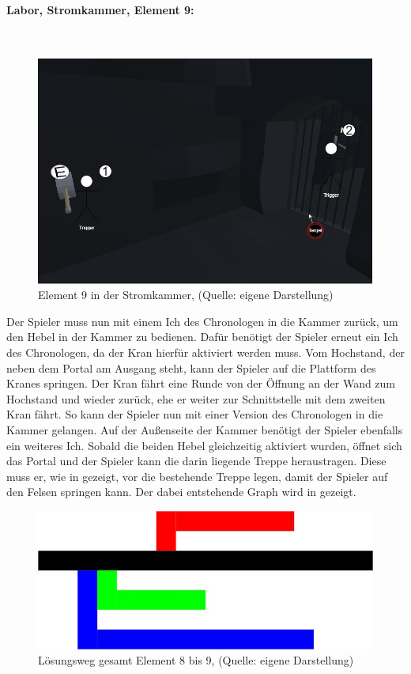 \paragraph{Labor, Stromkammer, Element 9:}\label{p:lse9}
~
\begin{figure}[ht]
\centering
\includegraphics[width=0.8\linewidth]{content/pictures/Raetsel-L02_R01_R10.jpg}
\caption{Element 9 in der Stromkammer, (Quelle: eigene Darstellung)}
\label{fig:L02_R01_R10}
\end{figure}

Der Spieler muss nun mit einem Ich des Chronologen in die Kammer zurück, um den Hebel in der Kammer zu bedienen. Dafür benötigt der Spieler erneut ein Ich des Chronologen, da der Kran hierfür aktiviert werden muss. Vom Hochstand, der neben dem Portal am Ausgang steht, kann der Spieler auf die Plattform des Kranes springen. Der Kran fährt eine Runde von der Öffnung an der Wand zum Hochstand und wieder zurück, ehe er weiter zur Schnittstelle mit dem zweiten Kran fährt. So kann der Spieler nun mit einer  Version des Chronologen in die Kammer gelangen. Auf der Außenseite der Kammer benötigt der Spieler ebenfalls ein weiteres Ich. Sobald die beiden Hebel gleichzeitig aktiviert wurden, öffnet sich das Portal und der Spieler kann die darin liegende Treppe heraustragen. Diese muss er, wie in  gezeigt, vor die bestehende Treppe legen, damit der Spieler auf den Felsen springen kann. Der dabei entstehende Graph wird in  gezeigt.

\begin{figure}[ht]
\centering
\includegraphics[width=1\linewidth]{content/pictures/Raetsel-L02_E08_9_V01_Loesung.jpg}
\caption{Lösungsweg gesamt Element 8 bis 9, (Quelle: eigene Darstellung)}
\label{fig:L02_E08_9_V01}
\end{figure}


